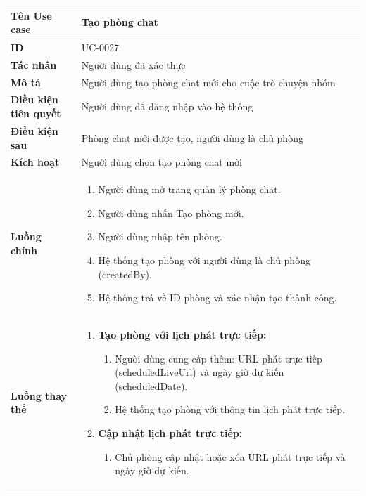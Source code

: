 {
\small
\renewcommand{\arraystretch}{1.15}

\begin{tabularx}{\textwidth}{|>{\raggedright\arraybackslash}p{3.5cm}|>{\raggedright\arraybackslash}X|}
\hline
\textbf{Tên Use case} & Tạo phòng chat \\
\hline
\textbf{ID} & UC-0027 \\
\hline
\textbf{Tác nhân} & Người dùng đã xác thực \\
\hline
\textbf{Mô tả} & Người dùng tạo phòng chat mới cho cuộc trò chuyện nhóm \\
\hline
\textbf{Điều kiện tiên quyết} & Người dùng đã đăng nhập vào hệ thống \\
\hline
\textbf{Điều kiện sau} & Phòng chat mới được tạo, người dùng là chủ phòng \\
\hline
\textbf{Kích hoạt} & Người dùng chọn tạo phòng chat mới \\
\hline
\textbf{Luồng chính} &
\begin{enumerate}
    \item Người dùng mở trang quản lý phòng chat.
    \item Người dùng nhấn Tạo phòng mới.
    \item Người dùng nhập tên phòng.
    \item Hệ thống tạo phòng với người dùng là chủ phòng (createdBy).
    \item Hệ thống trả về ID phòng và xác nhận tạo thành công.
\end{enumerate} \\
\hline
\textbf{Luồng thay thế} &
\begin{enumerate}
    \item \textbf{Tạo phòng với lịch phát trực tiếp:}
    \begin{enumerate}
        \item[3A.] Người dùng cung cấp thêm: URL phát trực tiếp (scheduledLiveUrl) và ngày giờ dự kiến (scheduledDate).
        \item[4A.] Hệ thống tạo phòng với thông tin lịch phát trực tiếp.
    \end{enumerate}
    \item \textbf{Cập nhật lịch phát trực tiếp:}
    \begin{enumerate}
        \item[5B.] Chủ phòng cập nhật hoặc xóa URL phát trực tiếp và ngày giờ dự kiến.
    \end{enumerate}
\end{enumerate} \\

\end{tabularx}}
